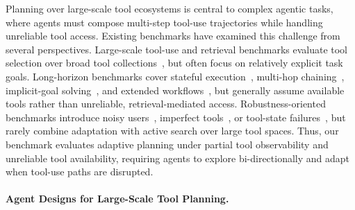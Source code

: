 \documentclass{llmxive}
\begin{document}
Planning over large-scale tool ecosystems is central to complex agentic tasks, where agents must compose multi-step tool-use trajectories while handling unreliable tool access. 
Existing benchmarks have examined this challenge from several perspectives. 
Large-scale tool-use and retrieval benchmarks evaluate tool selection over broad tool collections~\citep{ToolBench,APIBench,API-Bank,ToolRet,MCP-Bench,LiveMCPBench}, but often focus on relatively explicit task goals. 
Long-horizon benchmarks cover stateful execution~\citep{ToolSandbox}, multi-hop chaining~\citep{ToolHop}, implicit-goal solving~\citep{EscapeBench}, and extended workflows~\citep{Tool-Decathlon}, but generally assume available tools rather than unreliable, retrieval-mediated access.
Robustness-oriented benchmarks introduce noisy users~\citep{AgentNoiseBench,UserBench}, imperfect tools~\citep{OpaqueToolsBench,ToolQA-D}, or tool-state failures~\citep{ToolGym,CostBench}, but rarely combine adaptation with active search over large tool spaces. 
Thus, our benchmark evaluates adaptive planning under partial tool observability and unreliable tool availability, requiring agents to explore bi-directionally and adapt when tool-use paths are disrupted.

\paragraph{Agent Designs for Large-Scale Tool Planning.}


\end{document}
